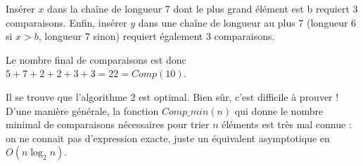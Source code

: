 Insérer $x$ dans la chaîne de longueur 7 dont le plus grand élément est b requiert 3 comparaisons. Enfin, insérer $y$ dans une chaîne de longueur au plus 7 (longueur 6 si $x>b$, longueur 7 sinon) requiert également 3 comparaisons.
\medskip

Le nombre final de comparaisons est donc $5+7+2+2+3+3=22=Comp(10)$.
\medskip

Il se trouve que l'algorithme 2 est optimal. Bien sûr, c'est difficile à prouver ! D'une manière générale, la fonction $Comp\_min(n)$ qui donne le nombre minimal de comparaisons nécessaires pour trier $n$ éléments est très mal connue : on ne connait pas d'expression exacte, juste un équivalent asymptotique en $O(n\log_2n)$.
\bigskip

\Fin
